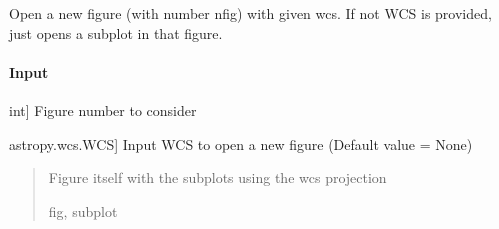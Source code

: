 \documentclass[letterpaper,10pt,english]{sphinxmanual}
\begin{document}

\begin{fulllineitems}
\label{\detokenize{api/pymusepipe:pymusepipe.graph_pipe.open_new_wcs_figure}}
\pysigstartsignatures
{}
\pysigstopsignatures
\sphinxAtStartPar
Open a new figure (with number nfig) with given wcs.
If not WCS is provided, just opens a subplot in that figure.


\paragraph{Input}
\label{\detokenize{api/pymusepipe:id78}}\begin{description}
\sphinxlineitem{nfig}{[}int{]}
\sphinxAtStartPar
Figure number to consider

\sphinxlineitem{mywcs}{[}astropy.wcs.WCS{]}
\sphinxAtStartPar
Input WCS to open a new figure (Default value = None)

\end{description}
\begin{quote}\begin{description}
\sphinxAtStartPar
Figure itself with the subplots using the wcs projection

\sphinxAtStartPar
fig, subplot

\end{description}\end{quote}

\end{fulllineitems}

\end{document}
